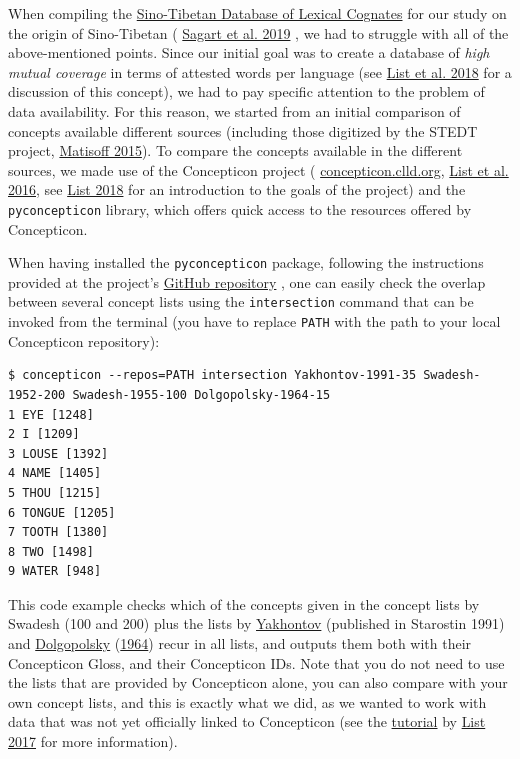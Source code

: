 \documentclass[
  a4paper,
  14pt,
  oneside,
  tablecaptionabove
]{scrbook}
\newcommand{\passthrough}[1]{#1}
\begin{document}
When compiling the
\href{https://dighl.github.io/sinotibetan}{Sino-Tibetan Database of
Lexical Cognates} for our study on the origin of Sino-Tibetan (
\href{http://bibliography.lingpy.org?key=Sagart2019}{Sagart et al. 2019}
, we had to struggle with all of the above-mentioned points. Since our
initial goal was to create a database of \emph{high mutual coverage} in
terms of attested words per language (see
\href{http://bibliography.lingpy.org?key=List2018d}{List et al. 2018}
for a discussion of this concept), we had to pay specific attention to
the problem of data availability. For this reason, we started from an
initial comparison of concepts available different sources (including
those digitized by the STEDT project,
\href{http://bibliography.lingpy.org?key=Matisoff2015}{Matisoff 2015}).
To compare the concepts available in the different sources, we made use
of the Concepticon project (
\href{https://concepticon.clld.org}{concepticon.clld.org},
\href{http://bibliography.lingpy.org?key=List2016a}{List et al. 2016},
see \href{http://bibliography.lingpy.org?key=List2018h}{List 2018} for
an introduction to the goals of the project) and the
\passthrough{\lstinline!pyconcepticon!} library, which offers quick
access to the resources offered by Concepticon.

When having installed the \passthrough{\lstinline!pyconcepticon!}
package, following the instructions provided at the project's
\href{https://github.com/concepticon/pyconcepticon/}{GitHub repository}
, one can easily check the overlap between several concept lists using
the \passthrough{\lstinline!intersection!} command that can be invoked
from the terminal (you have to replace \passthrough{\lstinline!PATH!}
with the path to your local Concepticon repository):

\begin{lstlisting}
$ concepticon --repos=PATH intersection Yakhontov-1991-35 Swadesh-1952-200 Swadesh-1955-100 Dolgopolsky-1964-15
1 EYE [1248]
2 I [1209]
3 LOUSE [1392]
4 NAME [1405]
5 THOU [1215]
6 TONGUE [1205]
7 TOOTH [1380]
8 TWO [1498]
9 WATER [948]
\end{lstlisting}

This code example checks which of the concepts given in the concept
lists by Swadesh (100 and 200) plus the lists by
\href{https://concepticon.clld.org/contributions/Yakhontov-1991-35}{Yakhontov}
(published in Starostin 1991) and
\href{https://concepticon.clld.org/contributions/Dolgopolsky-1964-15}{Dolgopolsky}
(\href{http://bibliography.lingpy.org?key=Dolgopolsky1964}{1964})
recur in all lists, and outputs them both with their Concepticon Gloss,
and their Concepticon IDs. Note that you do not need to use the lists
that are provided by Concepticon alone, you can also compare with your
own concept lists, and this is exactly what we did, as we wanted to work
with data that was not yet officially linked to Concepticon (see the
\href{https://github.com/digling/edictor-tutorial}{tutorial} by
\href{http://bibliography.lingpy.org?key=List2017LECTUREd}{List 2017}
for more information).
\end{document}
